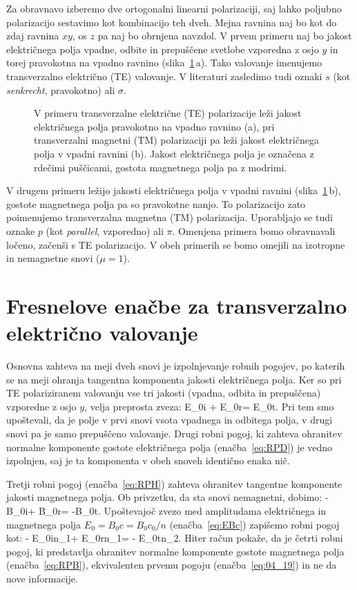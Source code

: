 Za obravnavo izberemo dve ortogonalni linearni polarizaciji, saj lahko
poljubno polarizacijo sestavimo kot kombinacijo teh dveh.
Mejna ravnina naj bo kot do zdaj ravnina $xy$, os $z$ pa naj bo obrnjena navzdol. 
V prvem primeru naj bo jakost električnega polja
vpadne, odbite in prepuščene svetlobe vzporedna z osjo $y$ in torej pravokotna
na vpadno ravnino (slika~\ref{fig:04_tetm}\,a). 
Tako valovanje imenujemo transverzalno električno (TE) valovanje. 
V literaturi zasledimo tudi oznaki $s$ (kot {\it senkrecht}, pravokotno) ali $\sigma$.

\begin{figure}[ht]
\centering
\def\svgwidth{140truemm} 

\caption{V primeru transverzalne električne (TE) polarizacije leži jakost
električnega polja pravokotno na vpadno ravnino (a),
pri transverzalni magnetni (TM) polarizaciji pa leži jakost električnega
polja v vpadni ravnini (b). Jakost električnega polja je označena z rdečimi
puščicami, gostota magnetnega polja pa z modrimi.}
\label{fig:04_tetm}
\end{figure}

V drugem primeru ležijo jakosti električnega polja v 
vpadni ravnini (slika~\ref{fig:04_tetm}\,b), gostote magnetnega polja 
pa so pravokotne nanjo. To polarizacijo zato poimenujemo 
transverzalna magnetna (TM) polarizacija. Uporabljajo se tudi oznake
$p$ (kot {\it parallel}, vzporedno) ali $\pi$. 
Omenjena primera bomo obravnavali ločeno, začenši s TE polarizacijo. V 
obeh primerih se bomo omejili na izotropne in nemagnetne snovi ($\mu=1$).

\section{Fresnelove enačbe za transverzalno električno valovanje}
Osnovna zahteva na meji dveh snovi je izpolnjevanje robnih
pogojev, po katerih se na meji ohranja tangentna komponenta jakosti električnega
polja. Ker so pri TE polariziranem valovanju 
vse tri jakosti (vpadna, odbita in prepuščena) vzporedne z osjo $y$, velja preprosta zveza:
\beq
E_{0i} + E_{0r}= E_{0t}.
\label{eq:04_19}
\eeq
Pri tem smo upoštevali, da je polje v prvi snovi vsota vpadnega in odbitega
polja, v drugi snovi pa je samo prepuščeno valovanje. Drugi robni pogoj, ki zahteva
ohranitev normalne komponente gostote električnega polja (enačba~\ref{eq:RPD}) je 
vedno izpolnjen, saj je ta komponenta v obeh snoveh identično enaka nič. 

Tretji robni pogoj (enačba~\ref{eq:RPH}) zahteva
ohranitev tangentne komponente jakosti magnetnega polja. Ob privzetku, da
sta snovi nemagnetni, dobimo:
\beq
-B_{0i}\cos \alpha + B_{0r}\cos \alpha = -B_{0t}\cos \beta.
\label{eq:04_20}
\eeq
Upoštevajoč zvezo med amplitudama električnega in magnetnega 
polja $E_0 = B_0 c = B_0 c_0/n$  (enačba~\ref{eq:EBc}) zapišemo robni pogoj kot:
\beq
- E_{0i}n_1\cos \alpha + E_{0r}n_1\cos \alpha = - E_{0t}n_2\cos \beta.
\label{eq:04_21}
\eeq 
Hiter račun pokaže, da je četrti robni pogoj, ki predstavlja ohranitev 
normalne komponente gostote magnetnega polja (enačba~\ref{eq:RPB}), 
ekvivalenten prvemu pogoju (enačba~\ref{eq:04_19}) in ne da nove informacije. 

